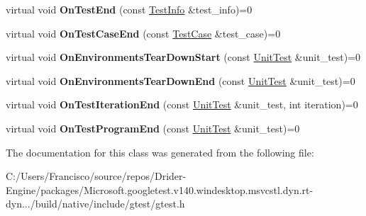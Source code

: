 \begin{DoxyCompactItemize}
\item 
\mbox{\label{classtesting_1_1_test_event_listener_abb1c44525ef038500608b5dc2f17099b}} 
virtual void {\bfseries On\+Test\+End} (const \hyperlink{classtesting_1_1_test_info}{Test\+Info} \&test\+\_\+info)=0
\item 
\mbox{\label{classtesting_1_1_test_event_listener_ae61985e2ef76ac78379b077be57a9c36}} 
virtual void {\bfseries On\+Test\+Case\+End} (const \hyperlink{classtesting_1_1_test_case}{Test\+Case} \&test\+\_\+case)=0
\item 
\mbox{\label{classtesting_1_1_test_event_listener_a468b5e6701bcb86cb2c956caadbba5e4}} 
virtual void {\bfseries On\+Environments\+Tear\+Down\+Start} (const \hyperlink{classtesting_1_1_unit_test}{Unit\+Test} \&unit\+\_\+test)=0
\item 
\mbox{\label{classtesting_1_1_test_event_listener_a9ea04fa7f447865ba76df35e12ba2092}} 
virtual void {\bfseries On\+Environments\+Tear\+Down\+End} (const \hyperlink{classtesting_1_1_unit_test}{Unit\+Test} \&unit\+\_\+test)=0
\item 
\mbox{\label{classtesting_1_1_test_event_listener_a550fdb3e55726e4cefa09f5697941425}} 
virtual void {\bfseries On\+Test\+Iteration\+End} (const \hyperlink{classtesting_1_1_unit_test}{Unit\+Test} \&unit\+\_\+test, int iteration)=0
\item 
\mbox{\label{classtesting_1_1_test_event_listener_ad15b6246d94c268e233487a86463ef3d}} 
virtual void {\bfseries On\+Test\+Program\+End} (const \hyperlink{classtesting_1_1_unit_test}{Unit\+Test} \&unit\+\_\+test)=0
\end{DoxyCompactItemize}


The documentation for this class was generated from the following file\+:\begin{DoxyCompactItemize}
\item 
C\+:/\+Users/\+Francisco/source/repos/\+Drider-\/\+Engine/packages/\+Microsoft.\+googletest.\+v140.\+windesktop.\+msvcstl.\+dyn.\+rt-\/dyn.../build/native/include/gtest/gtest.\+h\end{DoxyCompactItemize}

